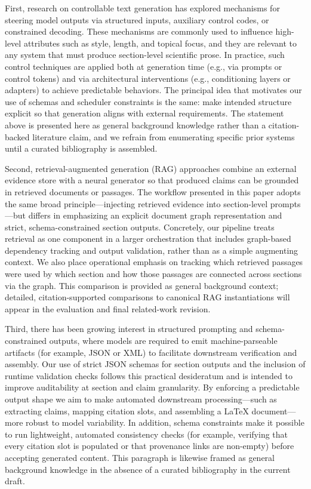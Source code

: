 \documentclass{article}%
\begin{document}
First, research on controllable text generation has explored mechanisms for steering model outputs via structured inputs, auxiliary control codes, or constrained decoding. These mechanisms are commonly used to influence high-level attributes such as style, length, and topical focus, and they are relevant to any system that must produce section-level scientific prose. In practice, such control techniques are applied both at generation time (e.g., via prompts or control tokens) and via architectural interventions (e.g., conditioning layers or adapters) to achieve predictable behaviors. The principal idea that motivates our use of schemas and scheduler constraints is the same: make intended structure explicit so that generation aligns with external requirements. The statement above is presented here as general background knowledge rather than a citation-backed literature claim, and we refrain from enumerating specific prior systems until a curated bibliography is assembled.

Second, retrieval-augmented generation (RAG) approaches combine an external evidence store with a neural generator so that produced claims can be grounded in retrieved documents or passages. The workflow presented in this paper adopts the same broad principle—injecting retrieved evidence into section-level prompts—but differs in emphasizing an explicit document graph representation and strict, schema-constrained section outputs. Concretely, our pipeline treats retrieval as one component in a larger orchestration that includes graph-based dependency tracking and output validation, rather than as a simple augmenting context. We also place operational emphasis on tracking which retrieved passages were used by which section and how those passages are connected across sections via the graph. This comparison is provided as general background context; detailed, citation-supported comparisons to canonical RAG instantiations will appear in the evaluation and final related-work revision.

Third, there has been growing interest in structured prompting and schema-constrained outputs, where models are required to emit machine-parseable artifacts (for example, JSON or XML) to facilitate downstream verification and assembly. Our use of strict JSON schemas for section outputs and the inclusion of runtime validation checks follows this practical desideratum and is intended to improve auditability at section and claim granularity. By enforcing a predictable output shape we aim to make automated downstream processing—such as extracting claims, mapping citation slots, and assembling a LaTeX document—more robust to model variability. In addition, schema constraints make it possible to run lightweight, automated consistency checks (for example, verifying that every citation slot is populated or that provenance links are non-empty) before accepting generated content. This paragraph is likewise framed as general background knowledge in the absence of a curated bibliography in the current draft.
\end{document}
